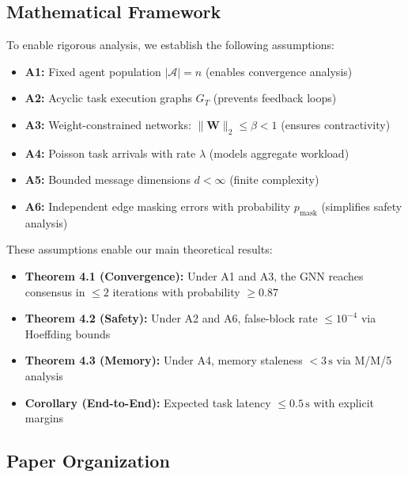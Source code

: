 \documentclass{article}
\begin{document}
    \subsection{Mathematical Framework}
    
    To enable rigorous analysis, we establish the following assumptions:
    
    \begin{tcolorbox}[colback=blue!5!white,colframe=blue!50!black,title=Core Assumptions]
    \begin{itemize}
    \item \textbf{A1:} Fixed agent population $|\mathcal{A}| = n$ (enables convergence analysis)
    \item \textbf{A2:} Acyclic task execution graphs $G_T$ (prevents feedback loops)
    \item \textbf{A3:} Weight-constrained networks: $\|\mathbf{W}\|_2 \leq \beta < 1$ (ensures contractivity)
    \item \textbf{A4:} Poisson task arrivals with rate $\lambda$ (models aggregate workload)
    \item \textbf{A5:} Bounded message dimensions $d < \infty$ (finite complexity)
    \item \textbf{A6:} Independent edge masking errors with probability $p_{\text{mask}}$ (simplifies safety analysis)
    \end{itemize}
    \end{tcolorbox}
    
    These assumptions enable our main theoretical results:
    \begin{itemize}
    \item \textbf{Theorem 4.1 (Convergence):} Under A1 and A3, the GNN reaches consensus in $\leq 2$ iterations with probability $\geq 0.87$
    \item \textbf{Theorem 4.2 (Safety):} Under A2 and A6, false-block rate $\leq 10^{-4}$ via Hoeffding bounds
    \item \textbf{Theorem 4.3 (Memory):} Under A4, memory staleness $< 3\,\text{s}$ via M/M/5 analysis
    \item \textbf{Corollary (End-to-End):} Expected task latency $\leq 0.5\,\text{s}$ with explicit margins
    \end{itemize}
    
    \subsection{Paper Organization}
    
\end{document}
